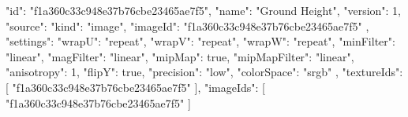 {
  "id": "f1a360c33c948e37b76cbe23465ae7f5",
  "name": "Ground Height",
  "version": 1,
  "source": {
    "kind": "image",
    "imageId": "f1a360c33c948e37b76cbe23465ae7f5"
  },
  "settings": {
    "wrapU": "repeat",
    "wrapV": "repeat",
    "wrapW": "repeat",
    "minFilter": "linear",
    "magFilter": "linear",
    "mipMap": true,
    "mipMapFilter": "linear",
    "anisotropy": 1,
    "flipY": true,
    "precision": "low",
    "colorSpace": "srgb"
  },
  "textureIds": [
    "f1a360c33c948e37b76cbe23465ae7f5"
  ],
  "imageIds": [
    "f1a360c33c948e37b76cbe23465ae7f5"
  ]
}
